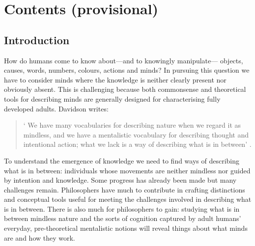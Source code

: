\documentclass[12pt,\papersize]{extarticle}
\begin{document}
\section{Contents (provisional)}



\subsection{Introduction}
How do humans come to know  about---and to knowingly manipulate---%
objects,
causes,
words,
numbers,
colours,
actions
and
minds?
In pursuing this question we have to consider minds where the knowledge is neither clearly present nor obviously absent. 
This is challenging because both commonsense and theoretical tools for describing minds are generally designed for characterising fully developed adults. 
Davidson writes:
%
\begin{quote}
`%
We have many vocabularies for describing nature when we regard it as mindless, and we have a mentalistic vocabulary for describing thought and intentional action; what we lack is a way of describing what is in between' \citep[p.\ 11]{Davidson:1999ju}.
\end{quote}
%
%
To understand the emergence of knowledge we need to find ways of describing what is in between: individuals whose movements are neither mindless nor guided by intention and knowledge.  
Some progress has already been made but many challenges remain. 
Philosophers have much to contribute in crafting distinctions and conceptual tools useful for meeting the challenges involved in describing what is in between. 
There is also much for philosophers to gain: studying what is in between mindless nature and the sorts of cognition captured by  adult humans' everyday, pre-theoretical mentalistic notions 
 will reveal things about what minds are and how they work.
\end{document}
